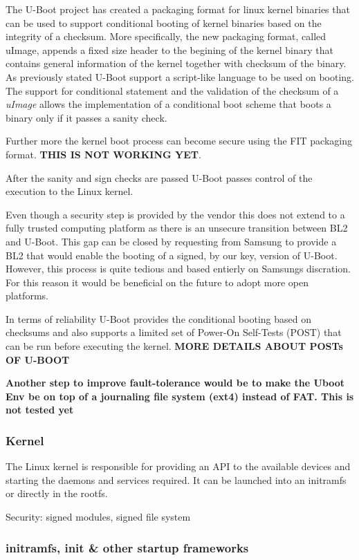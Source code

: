 The U-Boot project has created a packaging format for linux kernel binaries that can be used to support conditional booting of kernel binaries based on the integrity of a checksum. More specifically, the new packaging format, called uImage, appends a fixed size header to the begining of the kernel binary that contains general information of the kernel together with checksum of the binary. As previously stated U-Boot support a script-like language to be used on booting. The support for conditional statement and the validation of the checksum of a \textit{uImage} allows the implementation of a conditional boot scheme that boots a binary only if it passes a sanity check.

Further more the kernel boot process can become secure using the FIT packaging format. \textbf{THIS IS NOT WORKING YET}.

After the sanity and sign checks are passed U-Boot passes control of the execution to the Linux kernel.


Even though a security step is provided by the vendor this does not extend to a fully trusted computing platform as there is an unsecure transition between BL2 and U-Boot. This gap can be closed by requesting from Samsung to provide a BL2 that would enable the booting of a signed, by our key, version of U-Boot. However, this process is quite tedious and based entierly on Samsungs discration. For this reason it would be beneficial on the future to adopt more open platforms.

In terms of reliability U-Boot provides the conditional booting based on checksums and also supports a limited set of Power-On Self-Tests (POST) that can be run before executing the kernel. \textbf{MORE DETAILS ABOUT POSTs OF U-BOOT}

\textbf{Another step to improve fault-tolerance would be to make the Uboot Env be on top of a journaling file system (ext4) instead of FAT. This is not tested yet}

\subsubsection{Kernel}

The Linux kernel is responsible for providing an API to the available devices and starting the daemons and services required. It can be launched into an initramfs or directly in the rootfs.

Security: signed modules, signed file system

\subsubsection{initramfs, init \& other startup frameworks}

